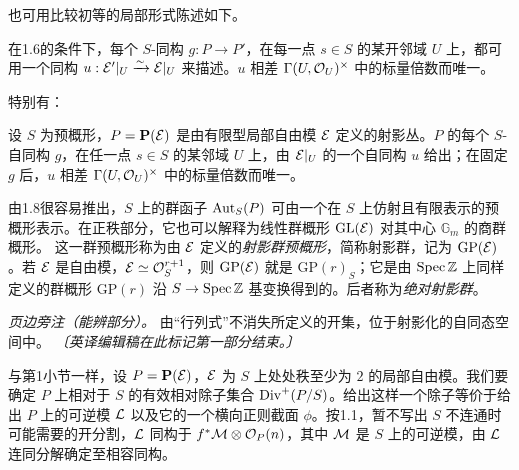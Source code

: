 也可用比较初等的局部形式陈述如下。


在1.6的条件下，每个 \(S\)-同构 \(g:P\to P'\)，在每一点 \(s\in S\) 的某开邻域 \(U\) 上，都可用一个同构
\(u:\mathcal E'|_U\xrightarrow{\sim}\mathcal E|_U\) 来描述。\(u\) 相差 \(\Gamma(U,\mathcal O_U)^\times\) 中的标量倍数而唯一。

特别有：


设 \(S\) 为预概形，\(P=\mathbf P(\mathcal E)\) 是由有限型局部自由模 \(\mathcal E\) 定义的射影丛。\(P\) 的每个 \(S\)-自同构 \(g\)，在任一点 \(s\in S\) 的某邻域 \(U\) 上，由 \(\mathcal E|_U\) 的一个自同构 \(u\) 给出；在固定 \(g\) 后，\(u\) 相差 \(\Gamma(U,\mathcal O_U)^\times\) 中的标量倍数而唯一。


由1.8很容易推出，\(S\) 上的群函子 \(\operatorname{Aut}_S(P)\) 可由一个在 \(S\) 上仿射且有限表示的预概形表示。在正秩部分，它也可以解释为线性群概形 \(\mathrm{GL}(\mathcal E)\) 对其中心 \(\mathbb G_m\) 的商群概形。
这一群预概形称为由 \(\mathcal E\) 定义的\emph{射影群预概形}，简称射影群，记为 \(\mathrm{GP}(\mathcal E)\)。若 \(\mathcal E\) 是自由模，\(\mathcal E\simeq\mathcal O_S^{r+1}\)，则 \(\mathrm{GP}(\mathcal E)\) 就是 \(\mathrm{GP}(r)_S\)；它是由 \(\operatorname{Spec}\mathbb Z\) 上同样定义的群概形 \(\mathrm{GP}(r)\) 沿 \(S\to\operatorname{Spec}\mathbb Z\) 基变换得到的。后者称为\emph{绝对射影群}。

\emph{页边旁注（能辨部分）。}
由“行列式”不消失所定义的开集，位于射影化的自同态空间中。
\emph{〔英译编辑稿在此标记第一部分结束。〕}


与第1小节一样，设 \(P=\mathbf P(\mathcal E)\)，\(\mathcal E\) 为 \(S\) 上处处秩至少为 \(2\) 的局部自由模。我们要确定 \(P\) 上相对于 \(S\) 的有效相对除子集合 \(\operatorname{Div}^+(P/S)\)。给出这样一个除子等价于给出 \(P\) 上的可逆模 \(\mathcal L\) 以及它的一个横向正则截面 \(\phi\)。按1.1，暂不写出 \(S\) 不连通时可能需要的开分割，\(\mathcal L\) 同构于 \(f^*\mathcal M\otimes\mathcal O_P(n)\)，其中 \(\mathcal M\) 是 \(S\) 上的可逆模，由 \(\mathcal L\) 连同分解确定至相容同构。


